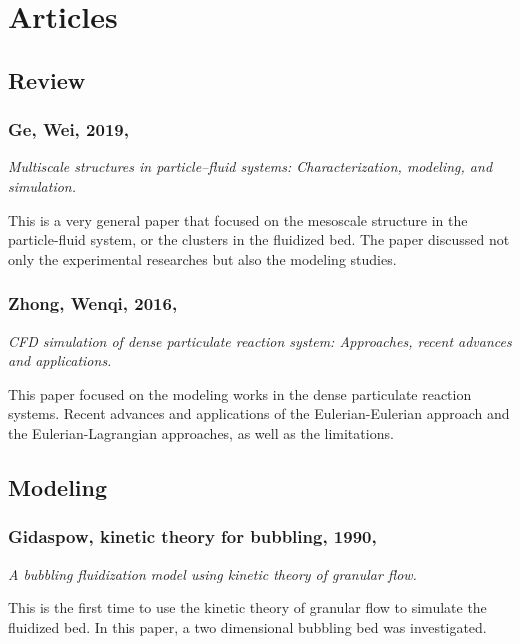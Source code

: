\chapter{Articles}
\section{Review}
%
%
\subsection[Ge, Wei, 2019]{Ge, Wei, 2019, \cite{ge2019multiscale}}
\textit{Multiscale structures in particle--fluid systems: Characterization, modeling, and simulation.}

This is a very general paper that focused on the mesoscale structure in the particle-fluid system, or the clusters in the fluidized bed. 
The paper discussed not only the experimental researches but also the modeling studies. 
%
%
\subsection[Zhong, Wenqi, 2016]{Zhong, Wenqi, 2016, \cite{zhong2016cfd}}
\textit{CFD simulation of dense particulate reaction system: Approaches, recent advances and applications.}

This paper focused on the modeling works in the dense particulate reaction systems. 
Recent advances and applications of the Eulerian-Eulerian approach and the Eulerian-Lagrangian approaches, as well as the limitations.

\section{Modeling}
%
%
\subsection[Gidaspow, kinetic theory for bubbling, 1990]{Gidaspow, kinetic theory for bubbling, 1990, \cite{Ding1990}}
\textit{A bubbling fluidization model using kinetic theory of granular flow.}

This is the first time to use the kinetic theory of granular flow to simulate the fluidized bed. 
In this paper, a two dimensional bubbling bed was investigated. 

%
%
